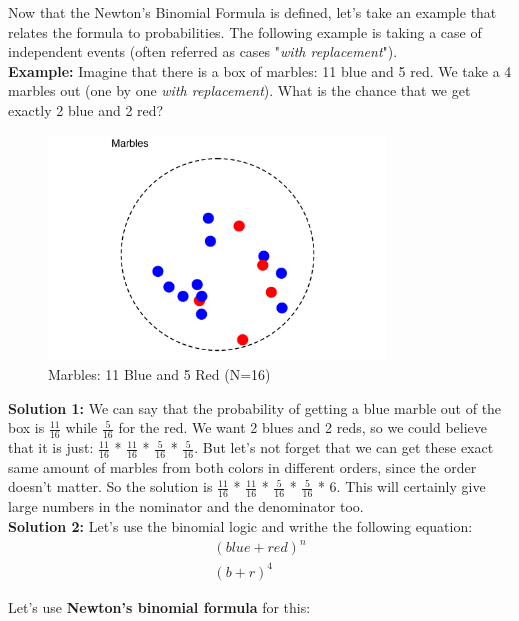 \documentclass{article}
\begin{document}
Now that the Newton's Binomial Formula is defined, let's take an example that relates the formula to probabilities. The following example is taking a case of independent events (often referred as cases "\textit{with replacement}"). \\

\textbf{Example: } Imagine that there is a box of marbles: 11 blue and 5 red. We take a 4 marbles out (one by one \textit{with replacement}). What is the chance that we get exactly 2 blue and 2 red?

\begin{figure}[h!]
    \centering
    \includegraphics[width=0.8\textwidth]{Marbles.png}
    \caption{Marbles: 11 Blue and 5 Red (N=16)}
    \label{fig:marbles}
\end{figure}

\textbf{Solution 1: } We can say that the probability of getting a blue marble out of the box is \(\frac{11}{16}\) while \(\frac{5}{16}\) for the red. We want 2 blues and 2 reds, so we could believe that it is just: \(\frac{11}{16}\) * \(\frac{11}{16}\) *  \(\frac{5}{16}\) * \(\frac{5}{16}\). But let's not forget that we can get these exact same amount of marbles from both colors in different orders, since the order doesn't matter. So the solution is \(\frac{11}{16}\) * \(\frac{11}{16}\) *  \(\frac{5}{16}\) * \(\frac{5}{16}\) * 6. This will certainly give large numbers in the nominator and the denominator too. \\

\textbf{Solution 2: } Let's use the binomial logic and writhe the following equation: 
\begin{align*}
(blue + red)^n \\
(b + r)^4 
\end{align*}

Let's use \textbf{Newton's binomial formula} for this: 
\end{document}
